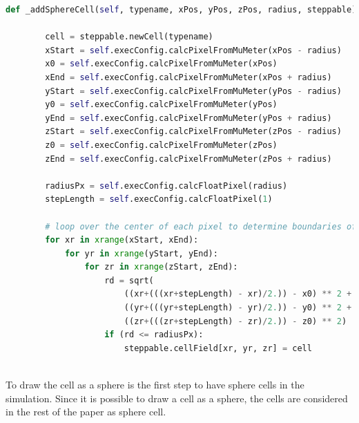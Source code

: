 \begin{lstlisting}[language=Python, caption = {[Created function to draw a sphere cell] Function to draw a cell as a sphere. First all required points for the calculation are converted into the voxel unit. Then it is iterated over each of the three axis. During these iterations for each voxel the distance to the center of the cuboid and sphere is calculated and then it is checked if the voxel is within the sphere or not. If the voxel is a part of the sphere it will be added to the sphere.}, label=lst:addSphereCell]
    def _addSphereCell(self, typename, xPos, yPos, zPos, radius, steppable):
    
        cell = steppable.newCell(typename)
        xStart = self.execConfig.calcPixelFromMuMeter(xPos - radius)
        x0 = self.execConfig.calcPixelFromMuMeter(xPos)
        xEnd = self.execConfig.calcPixelFromMuMeter(xPos + radius)
        yStart = self.execConfig.calcPixelFromMuMeter(yPos - radius)
        y0 = self.execConfig.calcPixelFromMuMeter(yPos)
        yEnd = self.execConfig.calcPixelFromMuMeter(yPos + radius)
        zStart = self.execConfig.calcPixelFromMuMeter(zPos - radius)
        z0 = self.execConfig.calcPixelFromMuMeter(zPos)
        zEnd = self.execConfig.calcPixelFromMuMeter(zPos + radius)

        radiusPx = self.execConfig.calcFloatPixel(radius)
        stepLength = self.execConfig.calcFloatPixel(1)
        
        # loop over the center of each pixel to determine boundaries of the circle
        for xr in xrange(xStart, xEnd):
            for yr in xrange(yStart, yEnd):
                for zr in xrange(zStart, zEnd):
                    rd = sqrt(
                        ((xr+(((xr+stepLength) - xr)/2.)) - x0) ** 2 +
                        ((yr+(((yr+stepLength) - yr)/2.)) - y0) ** 2 +
                        ((zr+(((zr+stepLength) - zr)/2.)) - z0) ** 2)
                    if (rd <= radiusPx):
                        steppable.cellField[xr, yr, zr] = cell
                        
\end{lstlisting}

To draw the cell as a sphere is the first step to have sphere cells in the simulation. Since it is possible to draw a cell as a sphere, the cells are considered in the rest of the paper as sphere cell. 


